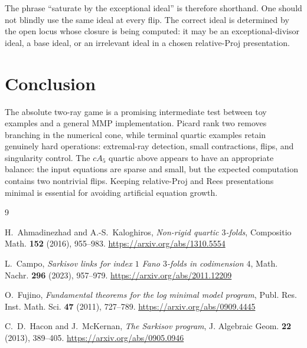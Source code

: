 \documentclass[11pt]{article}
\begin{document}
The phrase ``saturate by the exceptional ideal'' is therefore shorthand.  One
should not blindly use the same ideal at every flip.  The correct ideal is
determined by the open locus whose closure is being computed: it may be an
exceptional-divisor ideal, a base ideal, or an irrelevant ideal in a chosen
relative-Proj presentation.

\section{Conclusion}

The absolute two-ray game is a promising intermediate test between toy
examples and a general MMP implementation.  Picard rank two removes branching
in the numerical cone, while terminal quartic examples retain genuinely hard
operations: extremal-ray detection, small contractions, flips, and singularity
control.  The $cA_5$ quartic above appears to have an appropriate balance: the
input equations are sparse and small, but the expected computation contains
two nontrivial flips.  Keeping relative-Proj and Rees presentations minimal is
essential for avoiding artificial equation growth.

\begin{thebibliography}{9}

H.~Ahmadinezhad and A.-S.~Kaloghiros,
\emph{Non-rigid quartic $3$-folds},
Compositio Math. \textbf{152} (2016), 955--983.
\url{https://arxiv.org/abs/1310.5554}

L.~Campo,
\emph{Sarkisov links for index $1$ Fano $3$-folds in codimension $4$},
Math. Nachr. \textbf{296} (2023), 957--979.
\url{https://arxiv.org/abs/2011.12209}

O.~Fujino,
\emph{Fundamental theorems for the log minimal model program},
Publ. Res. Inst. Math. Sci. \textbf{47} (2011), 727--789.
\url{https://arxiv.org/abs/0909.4445}

C.~D.~Hacon and J.~McKernan,
\emph{The Sarkisov program},
J. Algebraic Geom. \textbf{22} (2013), 389--405.
\url{https://arxiv.org/abs/0905.0946}

\end{thebibliography}
\end{document}
